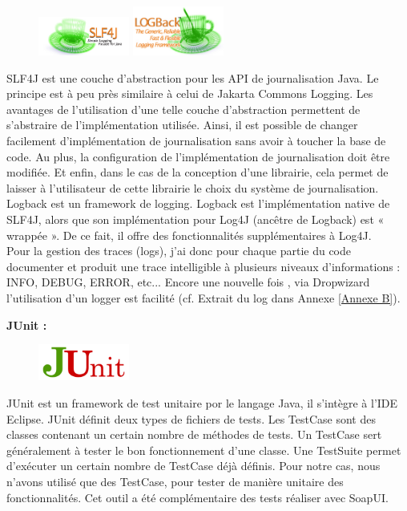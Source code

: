 \begin{itemize}
\begin{figure}
\centering
\includegraphics[width=3cm]{images/slf4j-logo.jpg}
\includegraphics[width=3cm]{images/lblogo.jpg}
\end{figure}
\noindent SLF4J est une couche d'abstraction pour les API de journalisation Java. Le principe est à peu près similaire à celui de Jakarta Commons Logging. Les avantages de l'utilisation d'une telle couche d'abstraction permettent de s'abstraire de l'implémentation utilisée. Ainsi, il est possible de changer facilement d'implémentation de journalisation sans avoir à toucher la base de code. Au plus, la configuration de l'implémentation de journalisation doit être modifiée. Et enfin, dans le cas de la conception d'une librairie, cela permet de laisser à l'utilisateur de cette librairie le choix du système de journalisation.\\
Logback est un framework de logging. Logback est l'implémentation native de SLF4J, alors que son implémentation pour Log4J (ancêtre de Logback) est « wrappée ». De ce fait, il offre des fonctionnalités supplémentaires à Log4J.\\
Pour la gestion des traces (logs), j'ai donc pour chaque partie du code documenter et produit une trace intelligible à plusieurs niveaux d'informations : INFO, DEBUG, ERROR, etc... Encore une nouvelle fois , via Dropwizard l'utilisation d'un logger est facilité (cf. Extrait du log dans Annexe \ref{Annexe B}).

\textbf{JUnit :} 

\begin{figure}
\centering
\includegraphics[width=3cm]{images/junit-logo.png}
\end{figure}
\noindent JUnit est un framework de test unitaire por le langage Java, il s'intègre à l'IDE Eclipse. JUnit définit deux types de fichiers de tests. Les TestCase sont des classes contenant un certain nombre de méthodes de tests. Un TestCase sert généralement à tester le bon fonctionnement d'une classe. Une TestSuite permet d'exécuter un certain nombre de TestCase déjà définis. Pour notre cas, nous n'avons utilisé que des TestCase, pour tester de manière unitaire des fonctionnalités. Cet outil a été complémentaire des tests réaliser avec SoapUI.



\end{itemize}
